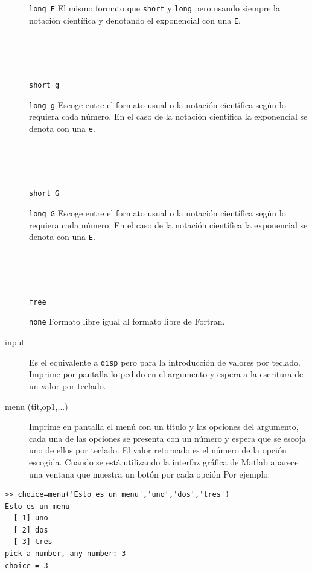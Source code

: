 \begin{description}
\begin{minipage}[c]{0.8\columnwidth}
{\texttt{long E}} El mismo formato que \texttt{short} y \texttt{long}
pero usando siempre la notación científica y denotando el exponencial
con una \texttt{E}.\end{minipage}%
\\
\\
\\
\begin{minipage}[c]{0.8\columnwidth}%
{\texttt{short g}} 

{\texttt{long g}} Escoge entre el formato usual o la notación científica
según lo requiera cada número. En el caso de la notación científica
la exponencial se denota con una \texttt{e}.\end{minipage}%
\\
\\
\\
\begin{minipage}[c]{0.8\columnwidth}%
{\texttt{short G}} 

{\texttt{long G}} Escoge entre el formato usual o la notación
científica según lo requiera cada número. En el caso de la notación
científica la exponencial se denota con una \texttt{E}.\end{minipage}%
\\
\\
\\
\begin{minipage}[c]{0.8\columnwidth}%
\texttt{free} 

\texttt{none} Formato libre igual al formato libre de
Fortran.\end{minipage}%

\item [input\index{input}]Es el equivalente a \texttt{disp} pero para
  la introducción de valores por teclado. Imprime por pantalla lo
  pedido en el argumento y espera a la escritura de un valor por
  teclado.
\item [{menu (tit,op1,...)}]Imprime en pantalla el menú
  con un título y las opciones del argumento, cada una de las opciones
  se presenta con un número y espera que se escoja uno de ellos por
  teclado.  El valor retornado es el número de la opción escogida.
  Cuando se está utilizando la interfaz gráfica de Matlab aparece una
  ventana que muestra un botón por cada opción Por ejemplo:
\end{description}
  \begin{lstlisting}
>> choice=menu('Esto es un menu','uno','dos','tres')
Esto es un menu
  [ 1] uno
  [ 2] dos
  [ 3] tres
pick a number, any number: 3
choice = 3
\end{lstlisting}

